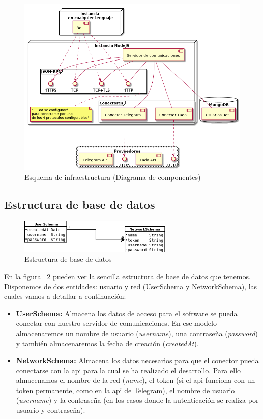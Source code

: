 \documentclass[spanish,12pt, a4paper, twoside]{paper}
\begin{document}
\begin{figure}
\centering
	\includegraphics[width=\textwidth]{recursos/component}
\caption{Esquema de infraestructura (Diagrama de componentes)}
\label{fig:Infraestructura de nodos}
\end{figure}

\subsection{Estructura de base de datos}

\begin{figure}
\centering
	\includegraphics[width=0.65\textwidth]{recursos/schemes}
\caption{Estructura de base de datos}
\label{fig:Estructura de base de datos}
\end{figure}

En la figura ~\ref{fig:Estructura de base de datos} pueden ver la sencilla estructura de base de datos que tenemos. Disponemos de dos entidades: usuario y red (UserSchema y NetworkSchema), las cuales vamos a detallar a continuación:

\begin{itemize}
\item\textbf{UserSchema:} Almacena los datos de acceso para el software se pueda conectar con nuestro servidor de comunicaciones. En ese modelo almacenaremos un nombre de usuario (\emph{username}), una contraseña (\emph{password}) y también almacenaremos la fecha de creación (\emph{createdAt}).

\item\textbf{NetworkSchema:} Almacena los datos necesarios para que el conector pueda conectarse con la api para la cual se ha realizado el desarrollo. Para ello almacenamos el nombre de la red (\emph{name}), el token (si el api funciona con un token permanente, como en la api de Telegram), el nombre de usuario (\emph{username}) y la contraseña (en los casos donde la autenticación se realiza por usuario y contraseña).
\end{itemize}
\end{document}
